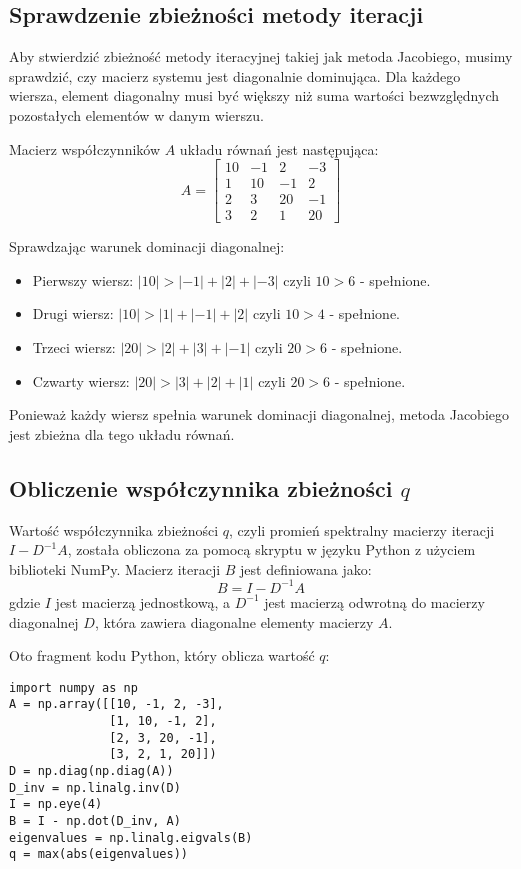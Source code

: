 \documentclass{article}
\begin{document}
\subsection*{Sprawdzenie zbieżności metody iteracji}
Aby stwierdzić zbieżność metody iteracyjnej takiej jak metoda Jacobiego, musimy sprawdzić, czy macierz systemu jest diagonalnie dominująca. Dla każdego wiersza, element diagonalny musi być większy niż suma wartości bezwzględnych pozostałych elementów w danym wierszu.

Macierz współczynników $A$ układu równań jest następująca:
\[
A = \begin{bmatrix}
10 & -1 & 2 & -3 \\
1 & 10 & -1 & 2 \\
2 & 3 & 20 & -1 \\
3 & 2 & 1 & 20
\end{bmatrix}
\]

Sprawdzając warunek dominacji diagonalnej:
\begin{itemize}
  \item Pierwszy wiersz: $|10| > |-1| + |2| + |-3|$ czyli $10 > 6$ - spełnione.
  \item Drugi wiersz: $|10| > |1| + |-1| + |2|$ czyli $10 > 4$ - spełnione.
  \item Trzeci wiersz: $|20| > |2| + |3| + |-1|$ czyli $20 > 6$ - spełnione.
  \item Czwarty wiersz: $|20| > |3| + |2| + |1|$ czyli $20 > 6$ - spełnione.
\end{itemize}

Ponieważ każdy wiersz spełnia warunek dominacji diagonalnej, metoda Jacobiego jest zbieżna dla tego układu równań.

\subsection*{Obliczenie współczynnika zbieżności \( q \)}
Wartość współczynnika zbieżności \( q \), czyli promień spektralny macierzy iteracji \( I - D^{-1}A \), została obliczona za pomocą skryptu w języku Python z użyciem biblioteki NumPy. Macierz iteracji \( B \) jest definiowana jako:
\[
B = I - D^{-1}A
\]
gdzie \( I \) jest macierzą jednostkową, a \( D^{-1} \) jest macierzą odwrotną do macierzy diagonalnej \( D \), która zawiera diagonalne elementy macierzy \( A \).

Oto fragment kodu Python, który oblicza wartość \( q \):
\begin{verbatim}
import numpy as np
A = np.array([[10, -1, 2, -3], 
              [1, 10, -1, 2], 
              [2, 3, 20, -1], 
              [3, 2, 1, 20]])
D = np.diag(np.diag(A))
D_inv = np.linalg.inv(D)
I = np.eye(4)
B = I - np.dot(D_inv, A)
eigenvalues = np.linalg.eigvals(B)
q = max(abs(eigenvalues))
\end{verbatim}
\end{document}
